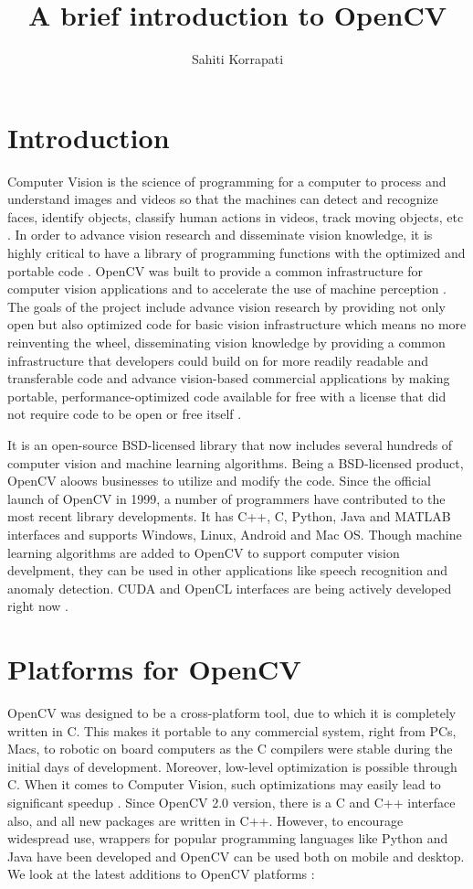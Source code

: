 \documentclass[9pt,twocolumn,twoside]{../../styles/osajnl}
\title{A brief introduction to OpenCV}
\author[1,*]{Sahiti Korrapati}
\affil[1]{School of Informatics and Computing, Bloomington, IN 47408, U.S.A.}
\affil[*]{Corresponding authors: sakorrap@iu.edu, S17-IR-2013}
\begin{document}
\maketitle
\section{Introduction}
Computer Vision is the science of programming for a computer to process and understand images and videos so that the machines can detect and recognize faces, identify objects, classify human actions in videos, track moving objects, etc \cite{www-about}. In order to advance vision research and disseminate vision knowledge, it is highly critical to have a library of programming functions with the optimized and portable code \cite{opencv-paper}. OpenCV was built to provide a common infrastructure for computer vision applications and to accelerate the use of machine perception \cite{www-about}. 
The goals of the project include advance vision research by providing not only open but also optimized code for basic vision infrastructure which means no more reinventing the wheel, disseminating vision knowledge by providing a common infrastructure that developers could build on for more readily readable and transferable code and advance vision-based commercial applications by making portable, performance-optimized code available for free with a license that did not require code to be open or free itself \cite{www-opencv-wiki}.

It is an open-source BSD-licensed library that now includes several hundreds of computer vision and machine learning algorithms. Being a BSD-licensed product, OpenCV aloows businesses to utilize and modify the code. Since the official launch of OpenCV in 1999, a number of programmers have contributed to the most recent library developments. It has C++, C, Python, Java and MATLAB interfaces and supports Windows, Linux, Android and Mac OS. Though machine learning algorithms are added to OpenCV to support computer vision develpment, they can be used in other applications like speech recognition and anomaly detection. CUDA and OpenCL interfaces are being actively developed right now \cite{www-about}.

\section{Platforms for OpenCV}
OpenCV was designed to be a cross-platform tool, due to which it is completely written in C. This makes it portable to any commercial system, right from PCs, Macs, to robotic on board computers as the C compilers were stable during the initial days of development. Moreover, low-level optimization is possible through C. When it comes to Computer Vision, such optimizations may easily lead to significant speedup \cite{www-platforms}. 
Since OpenCV 2.0 version, there is a C and C++ interface also, and all new packages are written in C++. However, to encourage widespread use, wrappers for popular programming languages like Python and Java have been developed and OpenCV can be used both on mobile and desktop. We look at the latest additions to OpenCV platforms \cite{www-platforms}:
\end{document}
